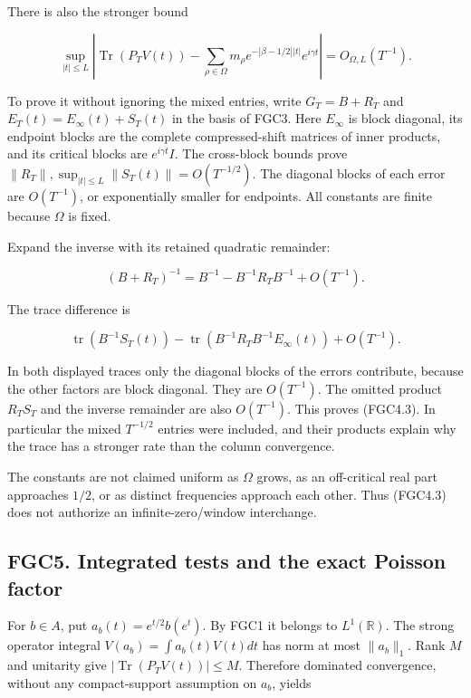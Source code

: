 There is also the stronger bound

\[
 \sup_{|t|\leq L}\left|
 \operatorname{Tr}(P_TV(t))-
 \sum_{\rho\in\Omega}m_\rho e^{-|\beta-1/2||t|}e^{i\gamma t}
 \right|=O_{\Omega,L}(T^{-1}).
\tag{FGC4.3}
\]

To prove it without ignoring the mixed entries, write \(G_T=B+R_T\) and
\(E_T(t)=E_\infty(t)+S_T(t)\) in the basis of FGC3. Here \(E_\infty\) is
block diagonal, its endpoint blocks are the complete compressed-shift
matrices of inner products, and its critical blocks are
\(e^{i\gamma t}I\). The cross-block bounds prove
\(\|R_T\|,\sup_{|t|\leq L}\|S_T(t)\|=O(T^{-1/2})\). The diagonal blocks
of each error are \(O(T^{-1})\), or exponentially smaller for endpoints.
All constants are finite because \(\Omega\) is fixed.

Expand the inverse with its retained quadratic remainder:

\[
 (B+R_T)^{-1}=B^{-1}-B^{-1}R_TB^{-1}+O(T^{-1}).
\]

The trace difference is

\[
 \operatorname{tr}(B^{-1}S_T(t))
 -\operatorname{tr}(B^{-1}R_TB^{-1}E_\infty(t))
 +O(T^{-1}).
\tag{FGC4.4}
\]

In both displayed traces only the diagonal blocks of the errors
contribute, because the other factors are block diagonal. They are
\(O(T^{-1})\). The omitted product \(R_TS_T\) and the inverse remainder
are also \(O(T^{-1})\). This proves (FGC4.3). In particular the mixed
\(T^{-1/2}\) entries were included, and their products explain why the
trace has a stronger rate than the column convergence.

The constants are not claimed uniform as \(\Omega\) grows, as an
off-critical real part approaches \(1/2\), or as distinct frequencies
approach each other. Thus (FGC4.3) does not authorize an
infinite-zero/window interchange.

\subsection{FGC5. Integrated tests and the exact Poisson
factor}\label{fgc5.-integrated-tests-and-the-exact-poisson-factor}

For \(b\in A\), put \(a_b(t)=e^{t/2}b(e^t)\). By FGC1 it belongs to
\(L^1(\mathbb R)\). The strong operator integral
\(V(a_b)=\int a_b(t)V(t)dt\) has norm at most \(\|a_b\|_1\). Rank \(M\)
and unitarity give \(|\operatorname{Tr}(P_TV(t))|\leq M\). Therefore
dominated convergence, without any compact-support assumption on
\(a_b\), yields


